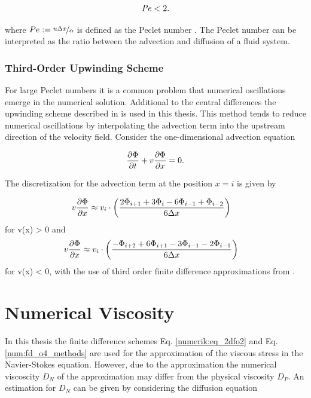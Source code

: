 \begin{align}
    \Pe  < 2.
\end{align}

where $ Pe := \nicefrac{u \Delta x}{\alpha}$ is defined as the Peclet number \citep{ferziger99}.
The Peclet number can be interpreted as the ratio between the advection and diffusion of a fluid system.

\subsubsection{Third-Order Upwinding Scheme}
\label{num:sec_para:upwindingscheme}

For large Peclet numbers it is a common problem that numerical oscillations emerge in the numerical solution.
Additional to the central differences the upwinding scheme described in \citep{ferziger99} is used in this thesis.
This method tends to reduce numerical oscillations by interpolating
the advection term into the upstream direction of the velocity field.
Consider the one-dimensional advection equation

\begin{align}
    \pdn[\Phi]{t} + v\pdn[\Phi]{x} = 0.
\end{align}

The discretization for the advection term at the position $x=i$ is given by

\begin{align}
    v\pdn[\Phi]{x} &\approx  v_i \cdot \left(\frac{2\Phi_{i+1} + 3\Phi_i     - 6\Phi_{i-1} + \Phi_{i-2}}{6\Delta x}\right)
\end{align}
for v(x) > 0 and
\begin{align}
    v\pdn[\Phi]{x} &\approx  v_i \cdot \left( \frac{-\Phi_{i+2} + 6\Phi_{i+1} - 3\Phi_{i-1} - 2\Phi_{i-1}}{6\Delta x}\right)
\end{align}
for v(x) < 0,
with the use of third order finite difference approximations from \citep{ferziger99}.

\newpage

\section{Numerical Viscosity}

In this thesis the finite difference schemes Eq. \ref{numerik:eq_2dfo2} and Eq. \ref{num:fd_o4_methods}
are used for the approximation of the viscous stress in the Navier-Stokes equation.
However, due to the approximation the numerical viscoscity $D_N$ of the approximation may differ from the physical viscosity $D_P$.
An estimation for $D_N$ can be given by considering the diffusion equation

